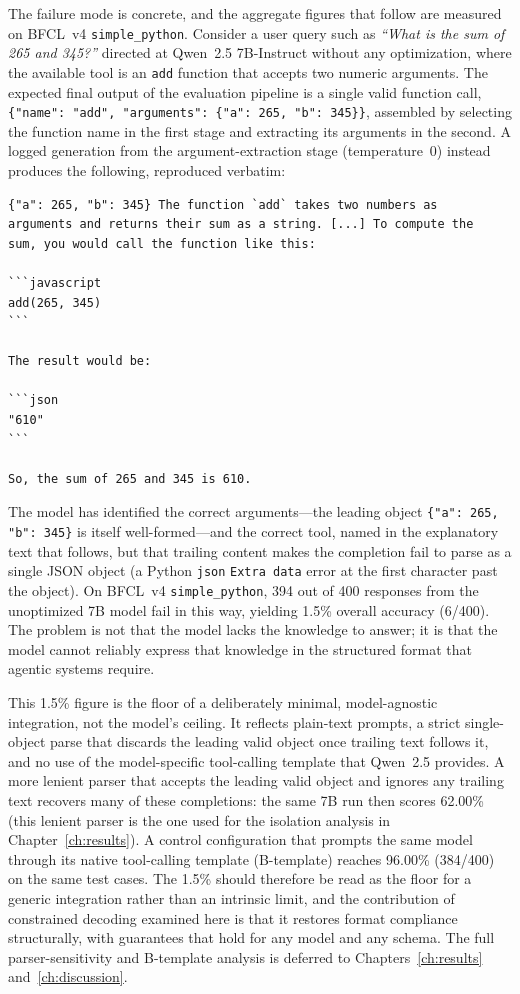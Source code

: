 The failure mode is concrete, and the aggregate figures that follow
are measured on BFCL~v4 \texttt{simple\_python}. Consider a user query such as
\textit{``What is the sum of 265 and 345?''} directed at Qwen~2.5 7B-Instruct
without any optimization, where the available tool is an \texttt{add} function
that accepts two numeric arguments. The expected final output of the
evaluation pipeline is a single valid function call,
\texttt{\{"name": "add", "arguments": \{"a": 265, "b": 345\}\}}, assembled by
selecting the function name in the first stage and extracting its arguments
in the second. A logged generation from the argument-extraction stage
(temperature~0) instead produces the following, reproduced verbatim:
\begin{verbatim}
{"a": 265, "b": 345} The function `add` takes two numbers as
arguments and returns their sum as a string. [...] To compute the
sum, you would call the function like this:

```javascript
add(265, 345)
```

The result would be:

```json
"610"
```

So, the sum of 265 and 345 is 610.
\end{verbatim}
The model has identified the correct arguments---the leading
object \texttt{\{"a": 265, "b": 345\}} is itself well-formed---and the
correct tool, named in the explanatory text that follows, but that
trailing content makes the completion fail to parse as a single JSON object (a Python \texttt{json}
\texttt{Extra data} error at the first character past the object). On
BFCL~v4 \texttt{simple\_python}, 394 out of 400 responses from the
unoptimized 7B model fail in this way, yielding 1.5\% overall accuracy
(6/400). The problem is not that the model lacks the knowledge to answer;
it is that the model cannot reliably express that knowledge in the
structured format that agentic systems require.

This 1.5\% figure is the floor of a deliberately minimal,
model-agnostic integration, not the model's ceiling. It reflects
plain-text prompts, a strict single-object parse that discards the
leading valid object once trailing text follows it, and no use of the
model-specific tool-calling template that Qwen~2.5 provides. A more
lenient parser that accepts the leading valid object and ignores any
trailing text recovers many of these completions: the same 7B run then
scores 62.00\% (this lenient parser is the one used for the isolation
analysis in Chapter~\ref{ch:results}). A control
configuration that prompts the same model through its native
tool-calling template (B-template) reaches 96.00\% (384/400) on the
same test cases. The 1.5\% should therefore be read as the floor for a
generic integration rather than an intrinsic limit, and the
contribution of constrained decoding examined here is that it restores
format compliance structurally, with guarantees that hold for any model
and any schema. The full parser-sensitivity and B-template analysis is
deferred to Chapters~\ref{ch:results} and~\ref{ch:discussion}.

